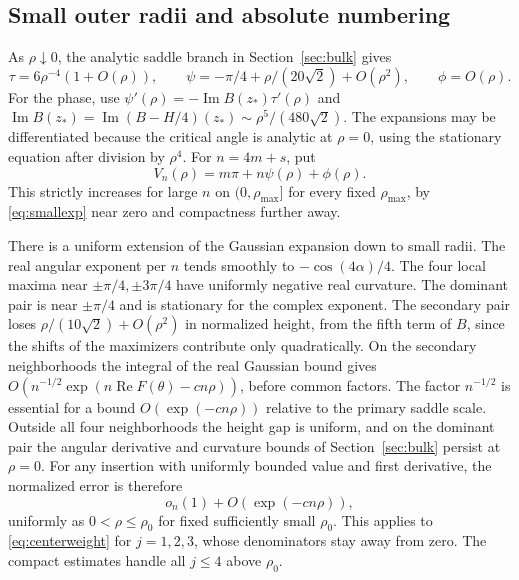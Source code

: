 \documentclass[11pt]{article}
\DeclareMathOperator{\Rea}{Re}
\DeclareMathOperator{\Ima}{Im}
\begin{document}
\subsection{Small outer radii and absolute numbering}\label{sec:index}
As \(\rho\downarrow0\), the analytic saddle branch in Section~\ref{sec:bulk} gives
\begin{equation}
 \tau=6\rho^{-4}(1+O(\rho)),\qquad
 \psi=-\pi/4+\rho/(20\sqrt2)+O(\rho^2),\qquad \phi=O(\rho).
 \label{eq:smallexp}
\end{equation}
For the phase, use \(\psi'(\rho)=-\Ima B(z_*)\tau'(\rho)\) and
\(\Ima B(z_*)=\Ima(B-H/4)(z_*)\sim\rho^5/(480\sqrt2)\). The expansions may be differentiated because the critical angle is analytic at \(\rho=0\), using the stationary equation after division by \(\rho^4\). For \(n=4m+s\), put
\[
 V_n(\rho)=m\pi+n\psi(\rho)+\phi(\rho).
\]
This strictly increases for large \(n\) on \((0,\rho_{\max}]\) for every fixed \(\rho_{\max}\), by \eqref{eq:smallexp} near zero and compactness further away.

There is a uniform extension of the Gaussian expansion down to small radii. The real angular exponent per \(n\) tends smoothly to \(-\cos(4\alpha)/4\). The four local maxima near \(\pm\pi/4,\pm3\pi/4\) have uniformly negative real curvature. The dominant pair is near \(\pm\pi/4\) and is stationary for the complex exponent. The secondary pair loses \(\rho/(10\sqrt2)+O(\rho^2)\) in normalized height, from the fifth term of \(B\), since the shifts of the maximizers contribute only quadratically. On the secondary neighborhoods the integral of the real Gaussian bound gives \(O(n^{-1/2}\exp(n\Rea F(\theta)-c n\rho))\), before common factors. The factor \(n^{-1/2}\) is essential for a bound \(O(\exp(-c n\rho))\) relative to the primary saddle scale. Outside all four neighborhoods the height gap is uniform, and on the dominant pair the angular derivative and curvature bounds of Section~\ref{sec:bulk} persist at \(\rho=0\). For any insertion with uniformly bounded value and first derivative, the normalized error is therefore
\begin{equation}
 o_n(1)+O(\exp(-c n\rho)),
 \label{eq:outererr}
\end{equation}
uniformly as \(0<\rho\le\rho_0\) for fixed sufficiently small \(\rho_0\). This applies to \eqref{eq:centerweight} for \(j=1,2,3\), whose denominators stay away from zero. The compact estimates handle all \(j\le4\) above \(\rho_0\).
\end{document}
